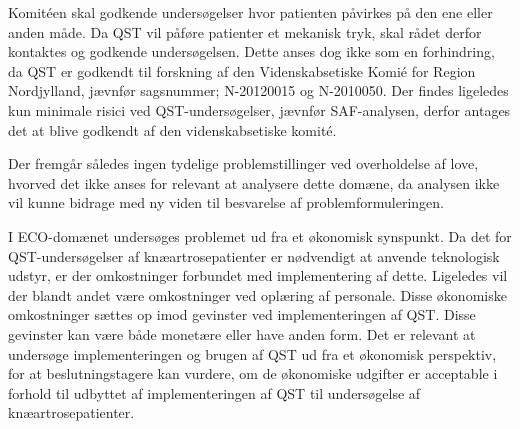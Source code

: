 Komitéen skal godkende undersøgelser hvor patienten påvirkes på den ene eller anden måde. Da QST vil påføre patienter et mekanisk tryk, skal rådet derfor kontaktes og godkende undersøgelsen.\citep{EtiskLov} Dette anses dog ikke som en forhindring, da QST er godkendt til forskning af den Videnskabsetiske Komié for Region Nordjylland, jævnfør sagsnummer; N-20120015 og N-2010050. Der findes ligeledes kun  minimale risici ved QST-undersøgelser, jævnfør SAF-analysen, derfor antages det at blive godkendt af den videnskabsetiske komité.

Der fremgår således ingen tydelige problemstillinger ved overholdelse af love, hvorved det ikke anses for relevant at analysere dette domæne, da analysen ikke vil kunne bidrage med ny viden til besvarelse af problemformuleringen.

I ECO-domænet undersøges problemet ud fra et økonomisk synspunkt. Da det for QST-undersøgelser af knæartrosepatienter er nødvendigt at anvende teknologisk udstyr, er der omkostninger forbundet med implementering af dette. Ligeledes vil der blandt andet være omkostninger ved oplæring af personale. Disse økonomiske omkostninger sættes op imod gevinster ved implementeringen af QST. Disse gevinster kan være både monetære eller have anden form. Det er relevant at undersøge implementeringen og brugen af QST ud fra et økonomisk perspektiv, for at beslutningstagere kan vurdere, om de økonomiske udgifter er acceptable i forhold til udbyttet af implementeringen af QST til undersøgelse af knæartrosepatienter. 

